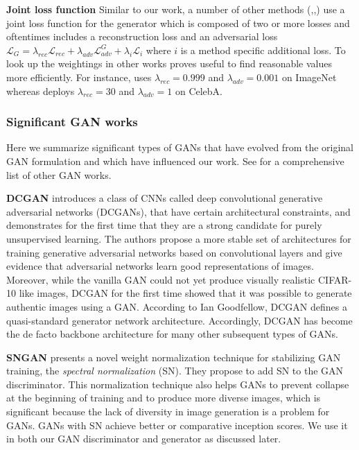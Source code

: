 \documentclass[12pt,a4paper]{article}
\begin{document}
\par \textbf{Joint loss function}
Similar to our work, a number of other methods (\cite{1511.05440},\cite{DisentFacOfVarByMixTh},\cite{1604.07379}) use a joint loss function for the generator which is composed of two or more losses and oftentimes includes a reconstruction loss and an adversarial loss $\mathcal{L}_G = \lambda_{rec}\mathcal{L}_{rec} + \lambda_{adv}\mathcal{L}^G_{adv} + \lambda_{i}\mathcal{L}_{i}$ where $i$ is a method specific additional loss. To look up the weightings in other works proves useful to find reasonable values more efficiently. For instance, \cite{1604.07379} uses $\lambda_{rec} = 0.999$ and $\lambda_{adv} = 0.001$ on ImageNet whereas \cite{DisentFacOfVarByMixTh} deploys $\lambda_{rec} = 30$ and $\lambda_{adv} = 1$ on CelebA.

\subsubsection{Significant GAN works}
Here we summarize significant types of GANs that have evolved from the original GAN formulation and which have influenced our work. See \cite{theGanZoo} for a comprehensive list of other GAN works.

\par \textbf{DCGAN} \cite{DCGAN} introduces a class of CNNs called deep convolutional generative adversarial networks (DCGANs), that have certain architectural constraints, and demonstrates for the first time that they are a strong candidate for purely unsupervised learning. The authors propose a more stable set of architectures for training generative adversarial networks based on convolutional layers and give evidence that adversarial networks learn good representations of images. Moreover, while the vanilla GAN could not yet produce visually realistic CIFAR-10 like images, DCGAN for the first time showed that it was possible to generate authentic images using a GAN. According to Ian Goodfellow, DCGAN defines a quasi-standard generator network architecture. Accordingly, DCGAN has become the de facto backbone architecture for many other subsequent types of GANs.

\par \textbf{SNGAN} \cite{SNGAN} presents a novel weight normalization technique for stabilizing GAN training, the \textit{spectral normalization} (SN). They propose to add SN to the GAN discriminator. This normalization technique also helps GANs to prevent collapse at the beginning of training and to produce more diverse images, which is significant because the lack of diversity in image generation is a problem for GANs. GANs with SN achieve better or comparative inception scores. We use it in both our GAN discriminator and generator as discussed later.
\end{document}
